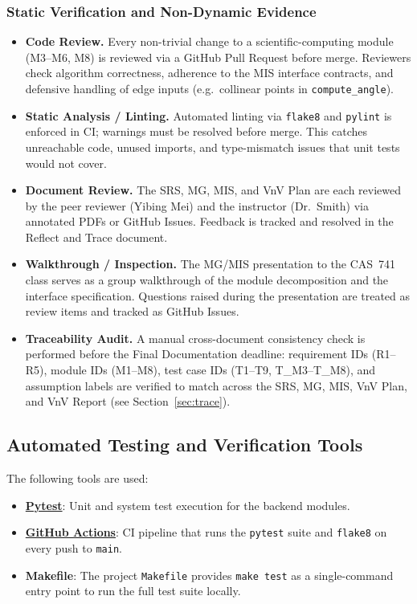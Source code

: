 \documentclass[12pt, titlepage]{article}
\begin{document}
\subsubsection{Static Verification and Non-Dynamic Evidence}
\begin{itemize}
    \item \textbf{Code Review.} Every non-trivial change to a
      scientific-computing module (M3--M6, M8) is reviewed via a GitHub
      Pull Request before merge. Reviewers check algorithm
      correctness, adherence to the MIS interface contracts, and
      defensive handling of edge inputs (e.g.\ collinear points in
      \texttt{compute\_angle}).
    \item \textbf{Static Analysis / Linting.} Automated linting via
      \texttt{flake8} and \texttt{pylint} is enforced in CI; warnings
      must be resolved before merge. This catches unreachable code,
      unused imports, and type-mismatch issues that unit tests would
      not cover.
    \item \textbf{Document Review.} The SRS, MG, MIS, and VnV Plan
      are each reviewed by the peer reviewer (Yibing Mei) and the
      instructor (Dr.\ Smith) via annotated PDFs or GitHub Issues.
      Feedback is tracked and resolved in the Reflect and Trace
      document.
    \item \textbf{Walkthrough / Inspection.} The MG/MIS presentation
      to the CAS~741 class serves as a group walkthrough of the module
      decomposition and the interface specification. Questions raised
      during the presentation are treated as review items and tracked
      as GitHub Issues.
    \item \textbf{Traceability Audit.} A manual cross-document
      consistency check is performed before the Final Documentation
      deadline: requirement IDs (R1--R5), module IDs (M1--M8), test
      case IDs (T1--T9, T\_M3--T\_M8), and assumption labels are
      verified to match across the SRS, MG, MIS, VnV Plan, and VnV
      Report (see Section~\ref{sec:trace}).
\end{itemize}

\subsection{Automated Testing and Verification Tools}
The following tools are used:
\begin{itemize}
    \item \href{https://docs.pytest.org/}{\textbf{Pytest}}: Unit and system test execution for the backend modules.
    \item \href{https://github.com/features/actions}{\textbf{GitHub Actions}}: CI pipeline that runs the \texttt{pytest} suite and \texttt{flake8} on every push to \texttt{main}.
    \item \textbf{Makefile}: The project \texttt{Makefile} provides
      \texttt{make test} as a single-command entry point to run the
      full test suite locally.
\end{itemize}
\end{document}
